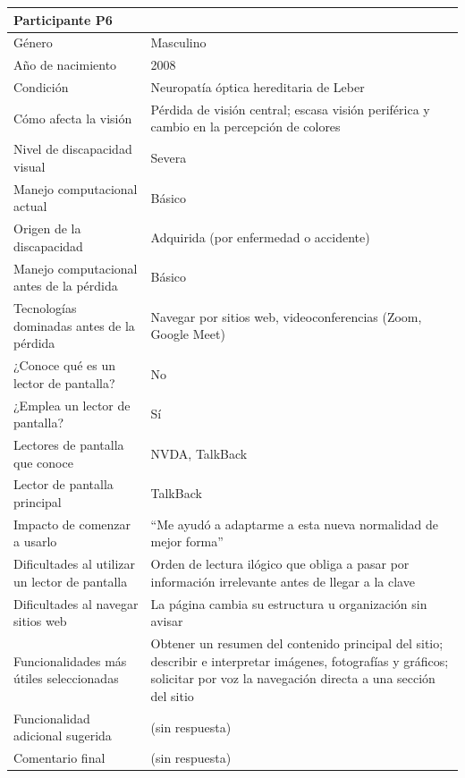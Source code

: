 \begin{longtable}{|p{4cm}|p{10.5cm}|}
    \multicolumn{2}{|l|}{\textbf{Participante P6}} \\
    \hline
    Género & Masculino \\
    \hline
    Año de nacimiento & 2008 \\
    \hline
    Condición & Neuropatía óptica hereditaria de Leber \\
    \hline
    Cómo afecta la visión & Pérdida de visión central; escasa visión periférica y cambio en la percepción de colores \\
    \hline
    Nivel de discapacidad visual & Severa \\
    \hline
    Manejo computacional actual & Básico \\
    \hline
    Origen de la discapacidad & Adquirida (por enfermedad o accidente) \\
    \hline
    Manejo computacional antes de la pérdida & Básico \\
    \hline
    Tecnologías dominadas antes de la pérdida & Navegar por sitios web, videoconferencias (Zoom, Google Meet) \\
    \hline
    ¿Conoce qué es un lector de pantalla? & No \\
    \hline
    ¿Emplea un lector de pantalla? & Sí \\
    \hline
    Lectores de pantalla que conoce & NVDA, TalkBack \\
    \hline
    Lector de pantalla principal & TalkBack \\
    \hline
    Impacto de comenzar a usarlo & ``Me ayudó a adaptarme a esta nueva normalidad de mejor forma'' \\
    \hline
    Dificultades al utilizar un lector de pantalla & Orden de lectura ilógico que obliga a pasar por información irrelevante antes de llegar a la clave \\
    \hline
    Dificultades al navegar sitios web & La página cambia su estructura u organización sin avisar \\
    \hline
    Funcionalidades más útiles seleccionadas & Obtener un resumen del contenido principal del sitio; describir e interpretar imágenes, fotografías y gráficos; solicitar por voz la navegación directa a una sección del sitio \\
    \hline
    Funcionalidad adicional sugerida & (sin respuesta) \\
    \hline
    Comentario final & (sin respuesta) \\
    \hline


\end{longtable}
